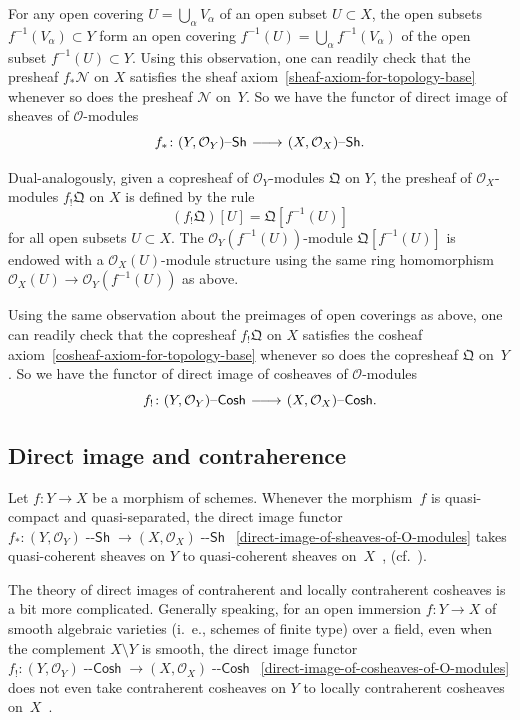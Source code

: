 \documentclass[12pt,a4paper]{amsart}
\newcommand{\+}{\nobreakdash-}
\renewcommand{\:}{\colon}
\newcommand{\rarrow}{\longrightarrow}
\newcommand{\lrarrow}{\mskip.5\thinmuskip\relbar\joinrel\relbar
   \joinrel\rightarrow\mskip.5\thinmuskip\relax}
\newcommand{\Sh}{{\operatorname{\mathsf{--Sh}}}}
\newcommand{\Cosh}{{\operatorname{\mathsf{--Cosh}}}}
\newcommand{\cO}{\mathcal O}
\newcommand{\cN}{\mathcal N}
\newcommand{\fQ}{\mathfrak Q}
\theoremstyle{plain}
\theoremstyle{definition}
\begin{document}
 For any open covering $U=\bigcup_\alpha V_\alpha$ of an open
subset $U\subset X$, the open subsets $f^{-1}(V_\alpha)\subset Y$
form an open covering $f^{-1}(U)=\bigcup_\alpha f^{-1}(V_\alpha)$
of the open subset $f^{-1}(U)\subset Y$.
 Using this observation, one can readily check that the presheaf
$f_*\cN$ on $X$ satisfies the sheaf
axiom~\eqref{sheaf-axiom-for-topology-base} whenever so does
the presheaf $\cN$ on~$Y$.
 So we have the functor of direct image of sheaves of $\cO$\+modules
\begin{equation} \label{direct-image-of-sheaves-of-O-modules}
 f_*\:(Y,\cO_Y)\Sh\lrarrow(X,\cO_X)\Sh.
\end{equation}

 Dual-analogously, given a copresheaf of $\cO_Y$\+modules $\fQ$ on $Y$,
the presheaf of $\cO_X$\+modules $f_!\fQ$ on $X$ is defined by
the rule
$$
 (f_!\fQ)[U]=\fQ[f^{-1}(U)]
$$
for all open subsets $U\subset X$.
 The $\cO_Y(f^{-1}(U))$\+module $\fQ[f^{-1}(U)]$ is endowed with
a $\cO_X(U)$\+module structure using the same ring homomorphism
$\cO_X(U)\rarrow\cO_Y(f^{-1}(U))$ as above.

 Using the same observation about the preimages of open coverings as
above, one can readily check that the copresheaf $f_!\fQ$ on $X$
satisfies the cosheaf axiom~\eqref{cosheaf-axiom-for-topology-base} 
whenever so does the copresheaf $\fQ$ on~$Y$.
 So we have the functor of direct image of cosheaves of $\cO$\+modules
\begin{equation} \label{direct-image-of-cosheaves-of-O-modules}
 f_!\:(Y,\cO_Y)\Cosh\lrarrow(X,\cO_X)\Cosh.
\end{equation}

\subsection{Direct image and contraherence}
\label{direct-image-and-contraherence-subsecn}
 Let $f\:Y\rarrow X$ be a morphism of schemes.
 Whenever the morphism~$f$ is quasi-compact and quasi-separated,
the direct image functor $f_*\:(Y,\cO_Y)\Sh\rarrow(X,\cO_X)\Sh$
\,\eqref{direct-image-of-sheaves-of-O-modules} takes quasi-coherent
sheaves on $Y$ to quasi-coherent sheaves on~$X$
\,\cite[Proposition~I.6.7.1]{EGAI}, \cite[Lemma Tag~01LC]{SP}
(cf.~\cite[Proposition~3.9.1(b)]{Pform}).

 The theory of direct images of contraherent and locally contraherent
cosheaves is a bit more complicated.
 Generally speaking, for an open immersion $f\:Y\rarrow X$ of smooth
algebraic varieties (i.~e., schemes of finite type) over a field,
even when the complement $X\setminus Y$ is smooth,
the direct image functor $f_!\:(Y,\cO_Y)\Cosh\rarrow(X,\cO_X)\Cosh$
\,\eqref{direct-image-of-cosheaves-of-O-modules} does not even take
contraherent cosheaves on $Y$ to locally contraherent cosheaves on~$X$
\,\cite[Remark~2.3.1 and Example~2.3.2]{Pcosh}.
\end{document}
